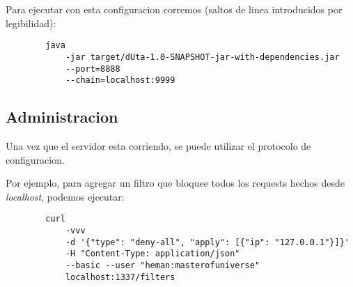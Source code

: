 \documentclass[11pt,a4paper,titlepage]{article}
\begin{document}
    Para ejecutar con esta configuracion corremos (saltos de linea introducidos por legibilidad):
    \begin{verbatim}
        java
            -jar target/dUta-1.0-SNAPSHOT-jar-with-dependencies.jar
            --port=8888
            --chain=localhost:9999
    \end{verbatim}

    \subsection{Administracion}
    Una vez que el servidor esta corriendo, se puede utilizar el protocolo de configuracion.

    Por ejemplo, para agregar un filtro que bloquee todos los requests hechos desde \textit{localhost}, podemos ejecutar:
    \begin{verbatim}
        curl
            -vvv
            -d '{"type": "deny-all", "apply": [{"ip": "127.0.0.1"}]}'
            -H "Content-Type: application/json"
            --basic --user "heman:masterofuniverse"
            localhost:1337/filters
    \end{verbatim}


\end{document}
